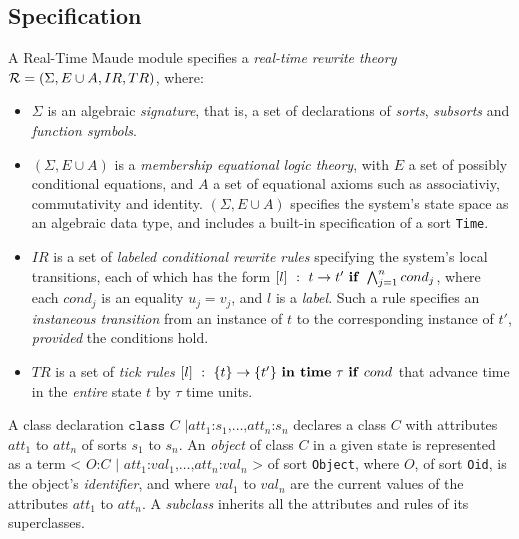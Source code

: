 \documentclass{llncs}
\begin{document}
\subsection{Specification}
A Real-Time Maude module specifies a \emph{real-time rewrite theory}
${\cal R} = (\Sigma, E\cup A , IR, TR)$, where:
\begin{itemize}
\item $\Sigma$ is an algebraic \emph{signature}, that is, a set of
  declarations of \emph{sorts}, \emph{subsorts} and \emph{function
    symbols}.
\item $(\Sigma, E\cup A)$ is a \emph{membership equational logic
  theory}, with $E$ a set of possibly conditional equations, and $A$ a
  set of equational axioms such as associativiy, commutativity and
  identity.  $(\Sigma, E\cup A)$ specifies the system's state space as
  an algebraic data type, and includes a built-in specification of a
  sort \verb|Time|.
\item $IR$ is a set of \emph{labeled conditional rewrite rules}
  specifying the system's local transitions, each of which has the
  form $[l]~:~t\rightarrow t'\mbox{ \textbf{if}
  }\bigwedge^n_{j=1}cond_j$, where each $cond_j$ is an equality
  $u_j=v_j$, and $l$ is a \emph{label}. Such a rule specifies an
  \emph{instaneous transition} from an instance of $t$ to the
  corresponding instance of $t'$, \emph{provided} the conditions hold.
\item $TR$ is a set of \emph{tick rules} $[l]~:~\{t\}\rightarrow\{t'\}
  \mbox{ \textbf{in time} }\tau\mbox{ \textbf{if} }cond$ that advance
  time in the \emph{entire} state $t$ by $\tau$ time units.
\end{itemize}

A class declaration $\texttt{class }C\texttt{ |
}att_1\texttt{:}s_1\texttt{,}\ldots\texttt{,}att_n\texttt{:}s_n$
declares a class $C$ with attributes $att_1$ to $att_n$ of sorts $s_1$
to $s_n$. An \emph{object} of class $C$ in a given state is
represented as a term $\texttt{< } O\texttt{:} C \texttt{ | }
att_1\texttt{:}val_1\texttt{,} \ldots
\texttt{,}att_n\texttt{:}val_n\texttt{ >}$ of sort \verb|Object|,
where $O$, of sort \verb|Oid|, is the object's \emph{identifier}, and
where $val_1$ to $val_n$ are the current values of the attributes
$att_1$ to $att_n$. A \emph{subclass} inherits all the attributes and
rules of its superclasses.
\end{document}
